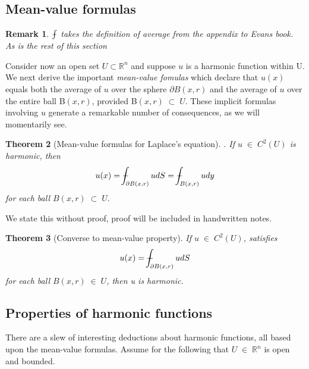 \documentclass[a4paper,10pt]{article}
\numberwithin{equation}{section}
\numberwithin{figure}{section}
\def\Xint#1{\mathchoice
{\XXint\displaystyle\textstyle{#1}}%
{\XXint\textstyle\scriptstyle{#1}}%
{\XXint\scriptstyle\scriptscriptstyle{#1}}%
{\XXint\scriptscriptstyle\scriptscriptstyle{#1}}%
\!\int}
\def\XXint#1#2#3{{\setbox0=\hbox{$#1{#2#3}{\int}$ }
\vcenter{\hbox{$#2#3$ }}\kern-.6\wd0}}
\def\dashint{\Xint-}
\theoremstyle{plain}
\newtheorem{theorem}{Theorem}[section]
\newtheorem{remark}[theorem]{Remark}
\begin{document}
\subsection{Mean-value formulas}
\begin{remark}
$\dashint$ takes the definition of average from the appendix to Evans book. As is the rest of this section
\cite{Evans_PDE} 
\end{remark}
 Consider now an open set $U \subset \mathbb{R}^{n}$ and suppose $u$ is a harmonic function within U.
We next derive the important \textit{mean-value fomulas} which declare that $u(x)$ equals both the average
of $u$ over the sphere $\partial B(x,r)$ and the average of $u$ over the entire ball B$(x,r)$, provided 
B$(x,r)\;\subset\;U.$ These implicit formulas involving $u$ generate a remarkable number of consequences, as
we will momentarily see. 
\begin{theorem}[Mean-value formulas for Laplace's equation].
 If $u\; \in\; C^{2}(U)$ is harmonic, then
\begin{equation}
 u(x) = \dashint_{\partial B(x,r)}u dS = \dashint_{B(x,r)}u dy
\end{equation}
for each ball $B(x,r)\;\subset\;U.$
\end{theorem}
We state this without proof, proof will be included in handwritten notes. 
\begin{theorem}[Converse to mean-value property]
 If $u\;\in\;C^{2}(U)$, satisfies 
\begin{displaymath}
 u(x) = \dashint_{\partial B(x,r)} u dS
\end{displaymath}
for each ball $B(x,r)\;\in\;U$, then u is harmonic.
\end{theorem}

\subsection{Properties of harmonic functions}
There are a slew of interesting deductions about harmonic functions, all based upon the mean-value
formulas. Assume for the following that $U\;\in\;\mathbb{R}^{n}$ is open and bounded. 
\end{document}
